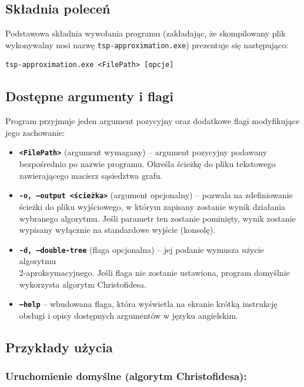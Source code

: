 \documentclass{article}
\theoremstyle{definition}
\theoremstyle{plain}
\theoremstyle{remark}
\begin{document}
\subsection{Składnia poleceń}

Podstawowa składnia wywołania programu (zakładając, że skompilowany plik wykonywalny nosi nazwę \texttt{tsp-approximation.exe}) prezentuje się następująco:

\begin{verbatim}
tsp-approximation.exe <FilePath> [opcje]
\end{verbatim}

\subsection{Dostępne argumenty i flagi}

Program przyjmuje jeden argument pozycyjny oraz dodatkowe flagi modyfikujące jego zachowanie:

\begin{itemize}
    \item \textbf{\texttt{<FilePath>}} (argument wymagany) -- argument pozycyjny podawany bezpośrednio po nazwie programu. Określa ścieżkę do pliku tekstowego zawierającego macierz sąsiedztwa grafu.
    \item \textbf{\texttt{-o, ---output <ścieżka>}} (argument opcjonalny) -- pozwala na zdefiniowanie ścieżki do pliku wyjściowego, w którym zapisany zostanie wynik działania wybranego algorytmu. Jeśli parametr ten zostanie pominięty, wynik zostanie wypisany wyłącznie na standardowe wyjście (konsolę).
    \item \textbf{\texttt{-d, ---double-tree}} (flaga opcjonalna) -- jej podanie wymusza użycie algorytmu \\ 2-aproksymacyjnego. Jeśli flaga nie zostanie ustawiona, program domyślnie wykorzysta algorytm Christofidesa.
    \item \textbf{\texttt{---help}} -- wbudowana flaga, która wyświetla na ekranie krótką instrukcję obsługi i opisy dostępnych argumentów w języku angielskim.
\end{itemize}

\subsection{Przykłady użycia}

\subsubsection*{Uruchomienie domyślne (algorytm Christofidesa):}
\end{document}
